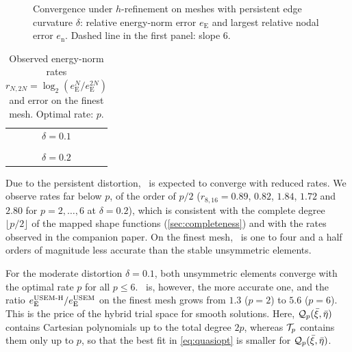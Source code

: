 \begin{figure}[tbp]
  \centering
  
  \caption{Convergence under $h$-refinement on meshes with persistent edge curvature $\delta$: relative energy-norm error $e_{\mathrm{E}}$ and largest relative nodal error $e_{\mathrm{n}}$. Dashed line in the first panel: slope $6$.}
  \label{fig:convergence}
\end{figure}

\begin{table}[htbp]
  \centering\small
  \caption{Observed energy-norm rates $r_{N,2N}=\log_2(e_{\mathrm{E}}^N/e_{\mathrm{E}}^{2N})$ and error on the finest mesh. Optimal rate: $p$.}
  \label{tab:rates}
  \begin{tabular}{@{}c@{}}
    $\delta=0.1$\\[2pt] \\[8pt]
    $\delta=0.2$\\[2pt] 
  \end{tabular}
\end{table}

Due to the persistent distortion, \PP\ is expected to converge with reduced rates. We observe rates far below $p$, of the order of $p/2$ ($r_{8,16}=0.89$, $0.82$, $1.84$, $1.72$ and $2.80$ for $p=2,\dots,6$ at $\delta=0.2$), which is consistent with the complete degree $\lfloor p/2\rfloor$ of the mapped shape functions (\cref{sec:completeness}) and with the rates observed in the companion paper. On the finest mesh, \PP\ is one to four and a half orders of magnitude less accurate than the stable unsymmetric elements.

For the moderate distortion $\delta=0.1$, both unsymmetric elements converge with the optimal rate $p$ for all $p\le6$. \PM\ is, however, the more accurate one, and the ratio $e_{\mathrm{E}}^{\text{USEM-H}}/e_{\mathrm{E}}^{\text{USEM}}$ on the finest mesh grows from $1.3$ ($p=2$) to $5.6$ ($p=6$). This is the price of the hybrid trial space for smooth solutions. Here, $\mathcal Q_p(\bar\xi,\bar\eta)$ contains Cartesian polynomials up to the total degree $2p$, whereas $\mathcal T_p$ contains them only up to $p$, so that the best fit in \cref{eq:quasiopt} is smaller for $\mathcal Q_p(\bar\xi,\bar\eta)$.

